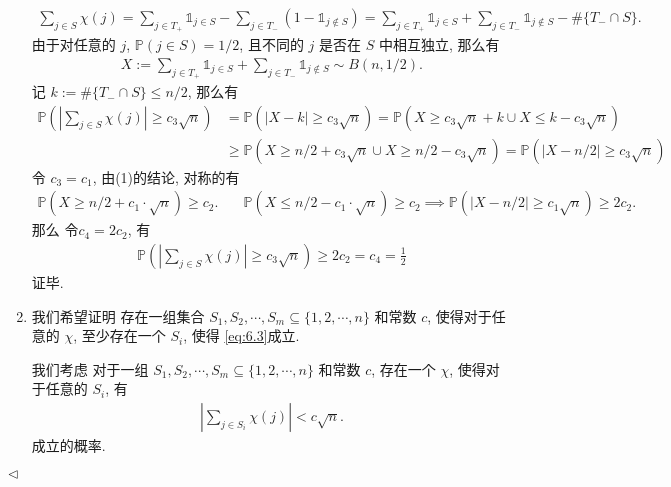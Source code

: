 \documentclass[11pt]{article}
\newenvironment{answer}[1][Solution]{\begin{trivlist}
    \item[\hskip \labelsep {\bfseries #1.}\hskip \labelsep]}{\hfill$\lhd$\end{trivlist}}
\newcommand\1{\mathds{1}}
\newcommand\PP{\mathbb{P}}
\begin{document}
\begin{answer}
\begin{enumerate}[label=(\arabic*)]
        \begin{align*}
            \sum_{j\in S}\chi(j) = \sum_{j\in T_+} \1_{j\in S} - \sum_{j\in T_-} (1-\1_{j\notin S}) = \sum_{j\in T_+} \1_{j\in S} + \sum_{j\in T_-} \1_{j\notin S} - \#\{T_-\cap S\}.
        \end{align*}
        由于对任意的 $j$, $\PP(j\in S) = 1/2$, 且不同的 $j$ 是否在 $S$ 中相互独立, 那么有
        \begin{align*}
            X := \sum_{j\in T_+} \1_{j\in S} + \sum_{j\in T_-} \1_{j\notin S} \sim B(n, 1/2).
        \end{align*}
        记 $k := \#\{T_-\cap S\} \le n/2$, 那么有
        \begin{align*}
            \PP\left(\left|\sum_{j\in S}\chi(j)\right| \ge c_3 \sqrt{n}\right)  &= \PP(|X-k| \ge c_3 \sqrt{n}) = \PP( X\ge c_3 \sqrt{n} + k \cup X \le k-c_3 \sqrt{n}) \\
            &\ge \PP( X\ge n/2 + c_3 \sqrt{n} \cup  X\ge n/2 - c_3 \sqrt{n}) = \PP\left(|X-n/2|\ge c_3\sqrt{n}\right)
        \end{align*}
        令 $c_3 = c_1$, 由(1)的结论, 对称的有
        \begin{align*}
            \PP(X\ge n/2 + c_1\cdot \sqrt{n}) \ge c_2. &\quad \PP(X\le n/2 - c_1\cdot \sqrt{n}) \ge c_2 \implies \PP\left(|X-n/2|\ge c_1\sqrt{n}\right) \ge 2c_2.
        \end{align*}
        那么 令$c_4 = 2c_2$, 有
        \begin{align*}
            \PP\left(\left|\sum_{j\in S}\chi(j)\right| \ge c_3 \sqrt{n}\right) \ge 2c_2 = c_4 = \frac{1}{2}
        \end{align*}
        证毕.
        \item  我们希望证明 存在一组集合 $S_1, S_2, \cdots, S_m \subseteq \{1,2,\cdots, n\}$ 和常数 $c$, 使得对于任意的 $\chi$, 至少存在一个 $S_i$, 使得 \eqref{eq:6.3}成立. 
        
        我们考虑 对于一组 $S_1, S_2, \cdots, S_m \subseteq \{1,2,\cdots, n\}$ 和常数 $c$, 存在一个 $\chi$, 使得对于任意的 $S_i$, 有
        \begin{align}
            \label{eq:6.4}
            \left|\sum_{j\in S_i}\chi(j)\right| < c\sqrt{n}.
        \end{align}
        成立的概率.


\end{enumerate}
\end{answer}
\end{document}
